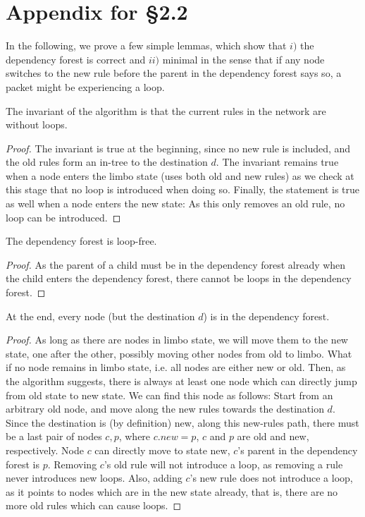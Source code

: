 \section{Appendix for \S2.2}

In the following, we prove a few simple lemmas, which show that $i)$ the dependency forest is correct and $ii)$ minimal in the sense that if any node switches to the new rule before the parent in the dependency forest says so, a packet might be experiencing a loop.

\begin{lemma}\label{lemma:invariant} The invariant of the algorithm is that the current rules in the network are without loops.
\end{lemma}

\begin{proof} The invariant is true at the beginning, since no new rule is included, and the old rules form an in-tree to the destination $d$. The invariant remains true when a node enters the limbo state (uses both old and new rules) as we check at this stage that no loop is introduced when doing so. Finally, the statement is true as well when a node enters the new state: As this only removes an old rule, no loop can be introduced.
\end{proof}

\begin{lemma}\label{lemma:loop-free} The dependency forest is loop-free.
\end{lemma}

\begin{proof} As the parent of a child must be in the dependency forest already when the child enters the dependency forest, there cannot be loops in the dependency forest.
\end{proof}

\begin{lemma}\label{lemma:forest} At the end, every node (but the destination $d$) is in the dependency forest.
\end{lemma}

\begin{proof} As long as there are nodes in limbo state, we will move them to the new state, one after the other, possibly moving other nodes from old to limbo. What if no node remains in limbo state, i.e. all nodes are either new or old. Then, as the algorithm suggests, there is always at least one node which can directly jump from old state to new state. We can find this node as follows: Start from an arbitrary old node, and move along the new rules towards the destination $d$. Since the destination is (by definition) new, along this new-rules path, there must be a last pair of nodes $c,p$, where $c.new = p$, $c$ and $p$ are old and new, respectively. Node $c$ can directly move to state new, $c$'s parent in the dependency forest is $p$. Removing $c$'s old rule will not introduce a loop, as removing a rule never introduces new loops. Also, adding $c$'s new rule does not introduce a loop, as it points to nodes which are in the new state already, that is, there are no more old rules which can cause loops.
\end{proof}


